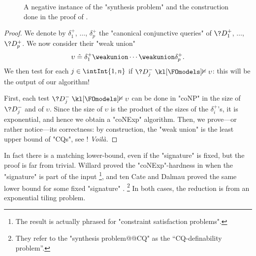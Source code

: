 \begin{figure}
	\centering
	\caption{
		\AP\label{fig:ex-synthesis-cq-negative}
		A negative instance of the "synthesis problem" and the construction
		done in the proof of .
	}
\end{figure}
\begin{proof}
	We denote by $\delta^+_1$, $\dotsc$, $\delta^+_p$ the "canonical conjunctive queries"
	of $\?D^+_1$, $\dotsc$, $\?D^+_p$.
	We now consider their "weak union"
	\[
		\upsilon \defeq \delta^+_1 \weakunion \cdots \weakunion \delta^+_p.
	\]
	We then test for each $j\in \intInt{1,n}$ if 
	$\?D^-_j \notFOmodels \upsilon$: this will be
	the output of our algorithm!
	
	First, each test $\?D^-_j \notFOmodels \upsilon$
	can be done in "coNP" in the size of $\?D^-_j$ and of
	$\upsilon$. Since the size of $\upsilon$ is the product of
	the sizes of the $\delta^+_i$'s, it is exponential,
	and hence we obtain a "coNExp" algorithm.
	Then, we prove---or rather notice---its correctness: by construction,
	the "weak union" is the least upper bound of "CQs",
	see ! \emph{Voilà.}
\end{proof}

In fact there is a matching lower-bound, even if the "signature" is fixed,
but the  proof is far from trivial.
Willard proved the "coNExp"-hardness in
\cite[Theorem~3]{Willard2010Testing} when the "signature" is part of the input%
\footnote{The result is actually phrased for "constraint satisfaction problems".},
and ten Cate and Dalmau proved the same lower bound
for some fixed "signature" \cite[Theorem~2]{tenCateDalmau2015Product}.%
\footnote{They refer to the "synthesis problem@@CQ" as the ``CQ-definability problem''.}
In both cases, the reduction is from an exponential tiling problem.

